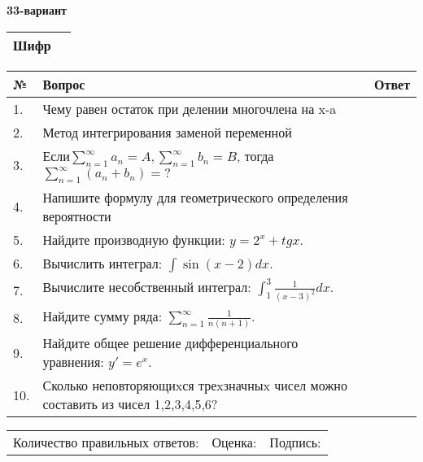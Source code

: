 \documentclass{article}
\begin{document}
  \egroup
  
  \newpage
  
  
  \textbf{33-вариант}\\
  
  \bgroup
  \def\arraystretch{1.6} %
  
  \begin{tabular}{|m{5.7cm}|m{9.5cm}|}
  \hline
  Шифр & \\
  \hline
  \end{tabular}
  
  \vspace{1cm}
  
  \begin{tabular}{|m{0.7cm}|m{10cm}|m{4cm}|}
  \hline
  № & Вопрос & Ответ \\
  \hline
  1. & Чему равен остаток при делении многочлена на x-a &  \\
  \hline
  2. & Метод интегрирования заменой переменной &  \\
  \hline
  3. & Если\(\sum_{n = 1}^{\infty}a_{n} = A,\sum_{n = 1}^{\infty}b_{n} = B\), тогда \(\sum_{n = 1}^{\infty}\left( a_{n} + b_{n} \right) = ?\) &  \\
  \hline
  4. & Напишите формулу для геометрического определения вероятности &  \\
  \hline
  5. & Найдите производную функции: \(y = 2^{x} + tgx\). &  \\
  \hline
  6. & Вычислить интеграл: \(\int{\sin(x - 2)dx}\). &  \\
  \hline
  7. & Вычислите несобственный интеграл: \(\int_{1}^{3}{\frac{1}{(x - 3)^{2}}dx}\). &  \\
  \hline
  8. & Найдите сумму ряда: \(\sum_{n = 1}^{\infty}\frac{1}{n(n + 1)}\). &  \\
  \hline
  9. & Найдите общее решение дифференциального уравнения: \(y' = e^{x}\). &  \\
  \hline
  10. & Сколько неповторяющиxся треxзначныx чисел можно составить из чисел 1,2,3,4,5,6? &  \\
  \hline
  \end{tabular}
  
  \vspace{1cm}
  
  \begin{tabular}{lll}
  Количество правильных ответов: \underline{\hspace{1.5cm}} & 
  Оценка: \underline{\hspace{1.5cm}} & 
  Подпись: \underline{\hspace{2cm}} \\
  \end{tabular}
  
\end{document}
